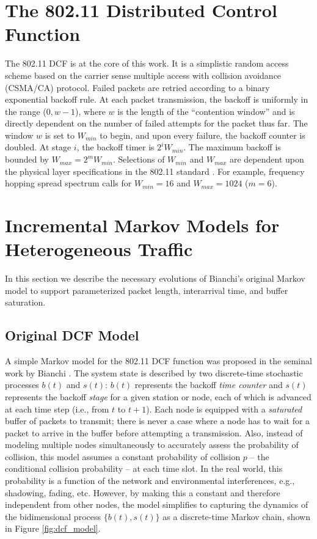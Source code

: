 \documentclass{llncs}
\begin{document}
\section{The 802.11 Distributed Control Function}
The 802.11 DCF \cite{ieee1997wireless} is at the core of this work. It is a simplistic random access scheme based on the carrier sense multiple access with collision avoidance (CSMA/CA) protocol. Failed packets are retried according to a binary exponential backoff rule. At each packet transmission, the backoff is uniformly in the range ($0, w-1$), where $w$ is the length of the ``contention window'' and is directly dependent on the number of failed attempts for the packet thus far. The window $w$ is set to $W_{min}$ to begin, and upon every failure, the backoff counter is doubled. At stage $i$, the backoff timer is $2^iW_{min}$. The maximum backoff is bounded by $W_{max} = 2^mW_{min}$. Selections of $W_{min}$ and $W_{max}$ are dependent upon the physical layer specifications in the 802.11 standard \cite{ieee1997wireless,dcf}. For example, frequency hopping spread spectrum calls for $W_{min} = 16$ and $W_{max} = 1024$ ($m = 6$). 

\section{Incremental Markov Models for Heterogeneous Traffic}
In this section we describe the necessary evolutions of Bianchi's original Markov model to support parameterized packet length, interarrival time, and buffer saturation.

\subsection{Original DCF Model}
A simple Markov model for the 802.11 DCF function was proposed in the seminal work by Bianchi \cite{dcf}. The system state is described by two discrete-time stochastic processes $b(t)$ and $s(t)$: $b(t)$ represents the backoff \emph{time counter} and $s(t)$ represents the backoff \emph{stage} for a given station or node, each of which is advanced at each time step (i.e., from $t$ to $t + 1$). Each node is equipped with a \emph{saturated} buffer of packets to transmit; there is never a case where a node has to wait for a packet to arrive in the buffer before attempting a transmission. Also, instead of modeling multiple nodes simultaneously to accurately assess the probability of collision, this model assumes a constant probability of collision $p$ -- the conditional collision probability -- at each time slot. In the real world, this probability is a function of the network and environmental interferences, e.g., shadowing, fading, etc. However, by making this a constant and therefore independent from other nodes, the model simplifies to capturing the dynamics of the bidimensional process $\{ b(t), s(t) \}$ as a discrete-time Markov chain, shown in Figure \ref{fig:dcf_model}. 
\end{document}
